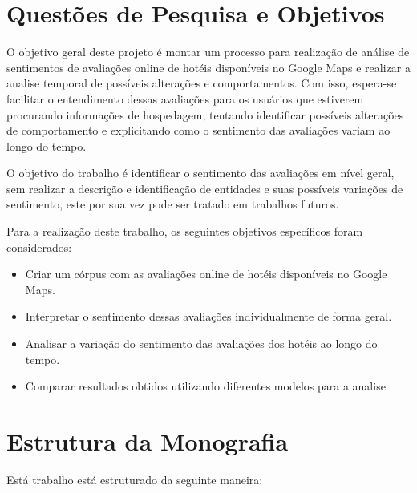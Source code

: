 \section{Questões de Pesquisa e Objetivos}


O objetivo geral deste projeto é montar um processo para realização de análise de sentimentos de avaliações online de hotéis disponíveis no Google Maps e realizar a analise temporal de possíveis alterações e comportamentos. Com isso, espera-se facilitar o entendimento dessas avaliações para os usuários que estiverem procurando informações de hospedagem, tentando identificar possíveis alterações de comportamento e explicitando como o sentimento das avaliações variam ao longo do tempo.

O objetivo do trabalho é identificar o sentimento das avaliações em nível geral, sem realizar a descrição e identificação de entidades e suas possíveis variações de sentimento, este por sua vez pode ser tratado em trabalhos futuros.

Para a realização deste trabalho, os seguintes objetivos específicos foram considerados:

\begin{itemize}
	\item Criar um córpus com as avaliações online de hotéis disponíveis no Google Maps.
	\item Interpretar o sentimento dessas avaliações individualmente de forma geral.
	\item Analisar a variação do sentimento das avaliações dos hotéis ao longo do tempo.
	\item Comparar resultados obtidos utilizando diferentes modelos para a analise
\end{itemize}


\section{Estrutura da Monografia}

Está trabalho está estruturado da seguinte maneira: 


